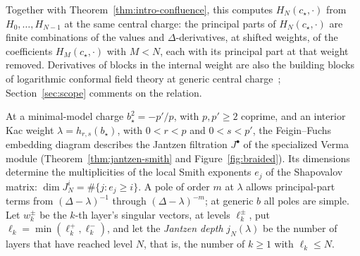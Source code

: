 \documentclass[twoside,10pt]{article}
\numberwithin{equation}{section}
\theoremstyle{slbody}
\theoremstyle{definition}
\theoremstyle{remark}
\begin{document}
Together with Theorem~\ref{thm:intro-confluence}, this computes
\(H_N(c_\star,\cdot)\) from \(H_0,\dots,H_{N-1}\) at the same central charge:
the principal parts of \(H_N(c_\star,\cdot)\) are finite combinations of the
values and \(\Delta\)-derivatives, at shifted weights, of the coefficients
\(H_M(c_\star,\cdot)\) with \(M<N\), each with its principal part at that
weight removed.  Derivatives of blocks in the internal
weight are also the building blocks of logarithmic conformal field theory at
generic central charge~\cite{NivesvivatRibault2021}; Section~\ref{sec:scope}
comments on the relation.

At a minimal-model charge \(b_\star^2=-p'/p\), with \(p,p'\geq2\) coprime, and
an interior Kac weight \(\lambda=h_{r,s}(b_\star)\), with \(0<r<p\) and
\(0<s<p'\), the Feigin--Fuchs
embedding diagram describes the Jantzen filtration \(J^\bullet\) of the
specialized Verma module (Theorem~\ref{thm:jantzen-smith} and
Figure~\ref{fig:braided}).  Its dimensions determine the multiplicities of
the local Smith exponents \(e_j\) of the Shapovalov matrix:
\(\dim J^i_N=\#\{j:e_j\geq i\}\).  A pole of order \(m\) at \(\lambda\)
allows principal-part terms from \((\Delta-\lambda)^{-1}\) through
\((\Delta-\lambda)^{-m}\); at generic \(b\) all poles are simple.  Let
\(w^\pm_k\) be the \(k\)-th layer's singular vectors, at levels
\(\ell^\pm_k\), put \(\ell_k=\min(\ell^+_k,\ell^-_k)\), and let the
\emph{Jantzen depth} \(j_N(\lambda)\) be the number of layers that have
reached level \(N\), that is, the number of \(k\geq1\) with
\(\ell_k\leq N\).
\end{document}

